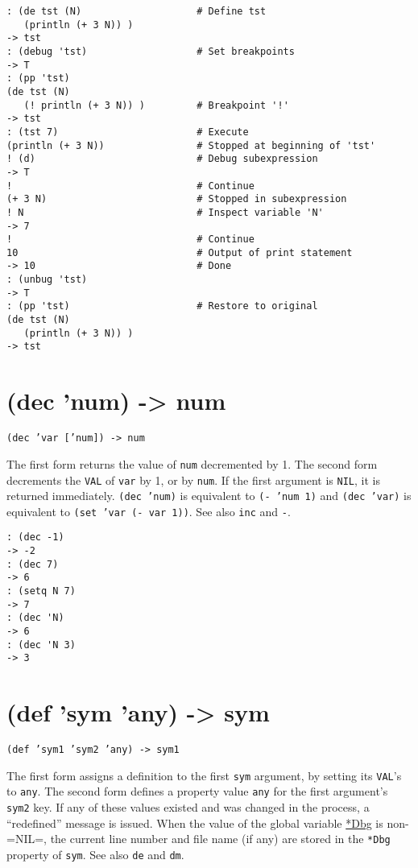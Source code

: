 {{{\begin{verbatim}
: (de tst (N)                    # Define tst
   (println (+ 3 N)) )
-> tst
: (debug 'tst)                   # Set breakpoints
-> T
: (pp 'tst)
(de tst (N)
   (! println (+ 3 N)) )         # Breakpoint '!'
-> tst
: (tst 7)                        # Execute
(println (+ 3 N))                # Stopped at beginning of 'tst'
! (d)                            # Debug subexpression
-> T
!                                # Continue
(+ 3 N)                          # Stopped in subexpression
! N                              # Inspect variable 'N'
-> 7
!                                # Continue
10                               # Output of print statement
-> 10                            # Done
: (unbug 'tst)
-> T
: (pp 'tst)                      # Restore to original
(de tst (N)
   (println (+ 3 N)) )
-> tst
\end{verbatim}

 
\section{(dec 'num) -> num}
\label{sec-8-1-4-22}


\texttt{(dec 'var ['num]) -> num}

The first form returns the value of \texttt{num} decremented by 1. The second
form decrements the \texttt{VAL} of \texttt{var} by 1, or by \texttt{num}. If the first
argument is \texttt{NIL}, it is returned immediately. \texttt{(dec 'num)} is
equivalent to \texttt{(- 'num 1)} and \texttt{(dec 'var)} is equivalent to
\texttt{(set 'var (- var 1))}. See also \texttt{inc} and \texttt{-}.


\begin{verbatim}
: (dec -1)
-> -2
: (dec 7)
-> 6
: (setq N 7)
-> 7
: (dec 'N)
-> 6
: (dec 'N 3)
-> 3
\end{verbatim}

 
\section{(def 'sym 'any) -> sym}
\label{sec-8-1-4-23}


\texttt{(def 'sym1 'sym2 'any) -> sym1}

The first form assigns a definition to the first \texttt{sym} argument, by
setting its \texttt{VAL}'s to \texttt{any}. The second form defines a property value
\texttt{any} for the first argument's \texttt{sym2} key. If any of these values
existed and was changed in the process, a ``redefined'' message is issued.
When the value of the global variable \hyperref[refD.html-Dbg]{*Dbg} is
non-=NIL=, the current line number and file name (if any) are stored in
the \texttt{*Dbg} property of \texttt{sym}. See also \texttt{de} and \texttt{dm}.


}}}
